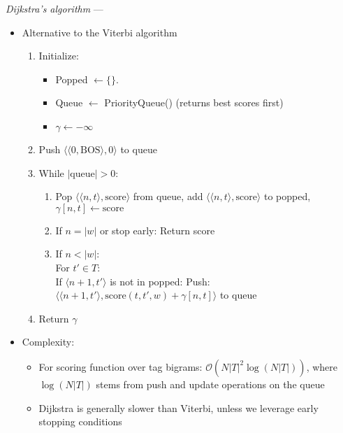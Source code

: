 \emph{Dijkstra’s algorithm} --- 
\begin{itemize}
    \item Alternative to the Viterbi algorithm 
    \begin{enumerate}
        \item Initialize:
        \begin{itemize}
            \item Popped $\gets \{ \}$.
            \item Queue $\gets$ PriorityQueue() (returns best scores first)
            \item $\gamma \gets -\infty$
        \end{itemize}

        \item Push $\langle\langle 0, \textrm{BOS} \rangle, 0\rangle$ to queue
    
        \item While $|\textrm{queue}| > 0$:
        \begin{enumerate}
            \item Pop $\langle \langle n, t \rangle, \textrm{score} \rangle$ from queue, add $\langle \langle n, t \rangle, \textrm{score} \rangle$ to popped, 
            $
            \gamma[n, t] \gets \textrm{score}
            $
            \item If $n = |w|$ or stop early: Return score    
            \item If $n < |w|$:\\
            For $t' \in T$:\\
            If $\langle n+1, t' \rangle$ is not in popped:
            Push:
            $
            \langle \langle n+1, t' \rangle, \textrm{score}(t, t', w) + \gamma[n, t] \rangle
            $
            to queue
        \end{enumerate}
        \item Return $\gamma$
    \end{enumerate}
    \item Complexity:
    \begin{itemize}
        \item For scoring function over tag bigrams: $\mathcal{O}(N |T|^2 \log(N |T|))$, where $\log(N |T|)$ stems from push and update operations on the queue
        \item Dijkstra is generally slower than Viterbi, unless we leverage early stopping conditions
    \end{itemize}
\end{itemize}

